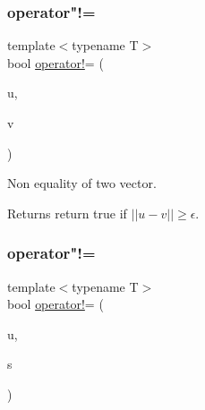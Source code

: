 \mbox{\label{class_n_vector_adf3470a73ee508e6b7292bdaed2d13ba}} 
\subsubsection{\texorpdfstring{operator"!=}{operator!=}\hspace{0.1cm}{\footnotesize\ttfamily [1/3]}}
{\footnotesize\ttfamily template$<$typename T$>$ \\
bool \mbox{\hyperlink{class_n_vector_a697b7e9e059d8045dc5f682f94521548}{operator!}}= (\begin{DoxyParamCaption}\item[{const \mbox{\hyperlink{class_n_vector}{N\+Vector}}$<$ T $>$ \&}]{u,  }\item[{const \mbox{\hyperlink{class_n_vector}{N\+Vector}}$<$ T $>$ \&}]{v }\end{DoxyParamCaption})\hspace{0.3cm}{\ttfamily [friend]}}



Non equality of two vector. 

\begin{DoxyReturn}{Returns}
return true if $ ||u - v|| \geq \epsilon $. 
\end{DoxyReturn}
\mbox{\label{class_n_vector_a5f6935537ff657c5c48c14090322e851}} 
\subsubsection{\texorpdfstring{operator"!=}{operator!=}\hspace{0.1cm}{\footnotesize\ttfamily [2/3]}}
{\footnotesize\ttfamily template$<$typename T$>$ \\
bool \mbox{\hyperlink{class_n_vector_a697b7e9e059d8045dc5f682f94521548}{operator!}}= (\begin{DoxyParamCaption}\item[{const \mbox{\hyperlink{class_n_vector}{N\+Vector}}$<$ T $>$ \&}]{u,  }\item[{T}]{s }\end{DoxyParamCaption})\hspace{0.3cm}{\ttfamily [friend]}}

